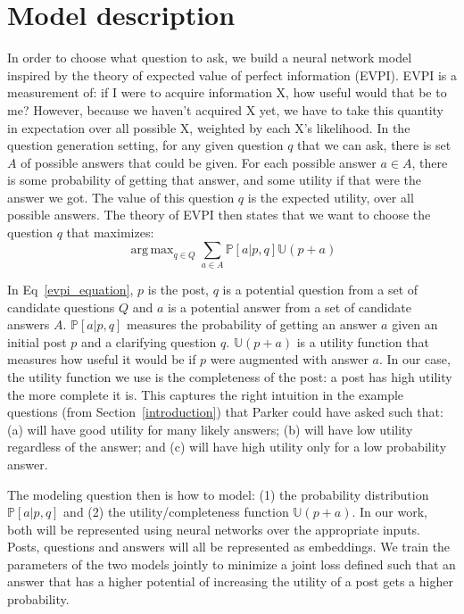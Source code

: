 \documentclass[11pt]{report}
\DeclareMathOperator*{\argmax}{arg\,max}
\newcommand{\U}{\mathbb{U}}
\begin{document}
\section{Model description}\label{model}

In order to choose what question to ask, we build a neural network model inspired by the theory of expected value of perfect information (EVPI). EVPI is a measurement of: if I were to acquire information X, how useful would that be to me? However, because we haven't acquired X yet, we have to take this quantity in expectation over all possible X, weighted by each X's likelihood. In the question generation setting, for any given question $q$ that we can ask, there is set $A$ of possible answers that could be given. For each possible answer $a \in A$, there is some probability of getting that answer, and some utility if that were the answer we got. The value of this question $q$ is the expected utility, over all possible answers. The theory of EVPI then states that we want to choose the question $q$ that maximizes:
\begin{equation}\label{evpi_equation}
\argmax_{q \in Q} \sum_{a \in A} \mathbb{P}[a | p,q] \U(p+a)
\end{equation} 

In Eq~\ref{evpi_equation}, $p$ is the post, $q$ is a potential question from a set of candidate questions $Q$ and $a$ is a potential answer from a set of candidate answers $A$. $\mathbb{P}[a | p,q]$ measures the probability of getting an answer $a$ given an initial post $p$ and a clarifying question $q$. $\U(p+a)$ is a utility function that measures how useful it would be if $p$ were augmented with answer $a$. In our case, the utility function we use is the completeness of the post: a post has high utility the more complete it is. This captures the right intuition in the example questions (from Section~\ref{introduction}) that Parker could have asked such that: \textsf{\small (a)} will have good utility for many likely answers;
\textsf{\small (b)} will have low utility regardless of the answer; and
\textsf{\small (c)} will have high utility only for a low probability answer.

The modeling question then is how to model: 
(1) the probability distribution $\mathbb{P}[a | p,q]$ and
(2) the utility/completeness function $\U(p+a)$.
In our work, both will be represented using neural networks over the appropriate inputs. Posts, questions and answers will all be represented as embeddings. We train the parameters of the two models jointly to minimize a joint loss defined such that an answer that has a higher potential of increasing the utility of a post gets a higher probability.
\end{document}
